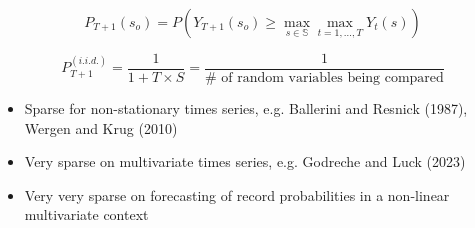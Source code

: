 \documentclass[9pt,compress]{beamer}
\begin{document}
\begin{frame}  
\begin{tcolorbox}[title= Inferential objective ]
$$
P_{T+1}(s_o) =P\left( Y_{T+1}(s_o)  \geq \max_{s \in \mathbb{S}} \max_{t=1, \dots, T} Y_t(s)\right)
$$
\end{tcolorbox}
\pause
\begin{tcolorbox}[title= Record probability for i.i.d. R.V   ]
$$
P_{T+1}^{(i.i.d.)} = \frac{1}{1 + T \times S} =  \frac{1}{ \textbf{\#}\text{ of random variables being compared}}
$$
\end{tcolorbox}
\pause
\begin{tcolorbox}[title= Literature on statistical models for record probabilities   ]
	\begin{itemize}
			\item Sparse for non-stationary times series, e.g. Ballerini and Resnick (1987), Wergen and Krug (2010)
			\item Very sparse on multivariate times series, e.g.  Godreche and Luck (2023)
			\item Very very sparse on forecasting of record probabilities in a non-linear multivariate context
\end{itemize}
\end{tcolorbox}

\end{frame}
%
%
%
\end{document}
